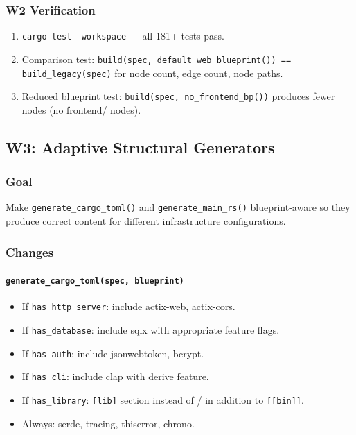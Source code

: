 \documentclass[11pt,a4paper]{article}
\begin{document}
\subsubsection{W2 Verification}

\begin{enumerate}[nosep]
\item \texttt{cargo test --workspace} --- all 181+ tests pass.
\item Comparison test: \texttt{build(spec, default\_web\_blueprint()) 
      == build\_legacy(spec)} for node count, edge count, node paths.
\item Reduced blueprint test: \texttt{build(spec, no\_frontend\_bp())}
      produces fewer nodes (no frontend/ nodes).
\end{enumerate}


\subsection{W3: Adaptive Structural Generators}
\label{sec:w3}

\subsubsection{Goal}

Make \texttt{generate\_cargo\_toml()} and \texttt{generate\_main\_rs()}
blueprint-aware so they produce correct content for different 
infrastructure configurations.

\subsubsection{Changes}

\paragraph{\texttt{generate\_cargo\_toml(spec, blueprint)}}

\begin{itemize}[nosep]
\item If \texttt{has\_http\_server}: include actix-web, actix-cors.
\item If \texttt{has\_database}: include sqlx with appropriate feature 
      flags.
\item If \texttt{has\_auth}: include jsonwebtoken, bcrypt.
\item If \texttt{has\_cli}: include clap with derive feature.
\item If \texttt{has\_library}: \texttt{[lib]} section instead of / 
      in addition to \texttt{[[bin]]}.
\item Always: serde, tracing, thiserror, chrono.
\end{itemize}
\end{document}
